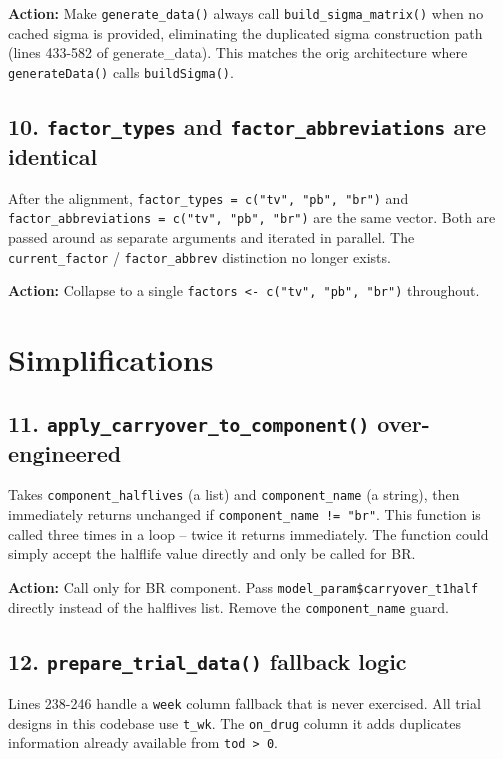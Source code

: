 \documentclass[11pt]{article}
\begin{document}
\textbf{Action:} Make \texttt{generate\_data()} always call \texttt{build\_sigma\_matrix()}
when no cached sigma is provided, eliminating the duplicated sigma
construction path (lines 433-582 of generate\_data). This matches
the orig architecture where \texttt{generateData()} calls \texttt{buildSigma()}.

\subsection{10. \texttt{factor\_types} and \texttt{factor\_abbreviations} are identical}

After the alignment, \texttt{factor\_types = c("tv", "pb", "br")} and
\texttt{factor\_abbreviations = c("tv", "pb", "br")} are the same vector.
Both are passed around as separate arguments and iterated in
parallel. The \texttt{current\_factor} / \texttt{factor\_abbrev} distinction no
longer exists.

\textbf{Action:} Collapse to a single \texttt{factors <- c("tv", "pb", "br")}
throughout.

\section{Simplifications}

\subsection{11. \texttt{apply\_carryover\_to\_component()} over-engineered}

Takes \texttt{component\_halflives} (a list) and \texttt{component\_name} (a
string), then immediately returns unchanged if \texttt{component\_name !=
"br"}. This function is called three times in a loop -- twice it
returns immediately. The function could simply accept the halflife
value directly and only be called for BR.

\textbf{Action:} Call only for BR component. Pass
\texttt{model\_param\$carryover\_t1half} directly instead of the halflives
list. Remove the \texttt{component\_name} guard.

\subsection{12. \texttt{prepare\_trial\_data()} fallback logic}

Lines 238-246 handle a \texttt{week} column fallback that is never
exercised. All trial designs in this codebase use \texttt{t\_wk}. The
\texttt{on\_drug} column it adds duplicates information already available
from \texttt{tod > 0}.
\end{document}
